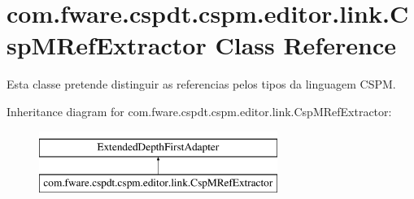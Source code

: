 \hypertarget{classcom_1_1fware_1_1cspdt_1_1cspm_1_1editor_1_1link_1_1_csp_m_ref_extractor}{}\section{com.\+fware.\+cspdt.\+cspm.\+editor.\+link.\+Csp\+M\+Ref\+Extractor Class Reference}
\label{classcom_1_1fware_1_1cspdt_1_1cspm_1_1editor_1_1link_1_1_csp_m_ref_extractor}


Esta classe pretende distinguir as referencias pelos tipos da linguagem C\+S\+PM.  


Inheritance diagram for com.\+fware.\+cspdt.\+cspm.\+editor.\+link.\+Csp\+M\+Ref\+Extractor\+:\begin{figure}[H]
\begin{center}
\leavevmode
\includegraphics[height=2.000000cm]{classcom_1_1fware_1_1cspdt_1_1cspm_1_1editor_1_1link_1_1_csp_m_ref_extractor}
\end{center}
\end{figure}
